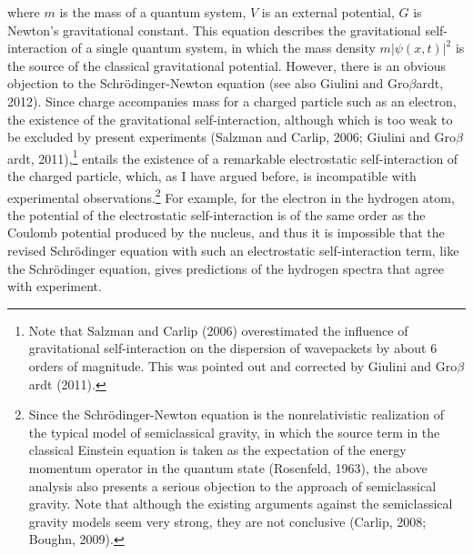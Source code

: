 \noindent  where $m$ is the mass of a quantum system, $V$ is an external potential, $G$  is Newton's gravitational constant. This equation describes the gravitational self-interaction of a single quantum system, in which the mass density $m|\psi(x,t)|^2$ is the source of the classical gravitational potential. However, there is an obvious objection to the Schr\"{o}dinger-Newton equation (see also Giulini and Gro$\beta$ardt, 2012). Since charge accompanies mass for a charged particle such as an electron, the existence of the gravitational self-interaction, although which is too weak to be excluded by present experiments (Salzman and Carlip, 2006; Giulini and Gro$\beta$ardt, 2011),\footnote{Note that Salzman and Carlip (2006) overestimated the influence of gravitational self-interaction on the dispersion of wavepackets by about 6 orders of magnitude. This was pointed out and corrected by Giulini and Gro$\beta$ardt (2011).} entails the existence of a remarkable electrostatic self-interaction of the charged particle, which, as I have argued before, is incompatible with experimental observations.\footnote{Since the Schr\"{o}dinger-Newton equation is the nonrelativistic realization of the typical model of semiclassical gravity, in which the source term in the classical Einstein equation is taken as the expectation of the energy momentum operator in the quantum state (Rosenfeld, 1963), the above analysis also presents a serious objection to the approach of semiclassical gravity. Note that although the existing arguments against the semiclassical gravity models seem very strong, they are not conclusive (Carlip, 2008; Boughn, 2009).} For example, for the electron in the hydrogen atom, the potential of the electrostatic self-interaction is of the same order as the Coulomb potential produced by the nucleus, and thus it is impossible that the revised Schr\"{o}dinger equation with such an electrostatic self-interaction term, like the Schr\"{o}dinger equation, gives predictions of the hydrogen spectra that agree with experiment.%

